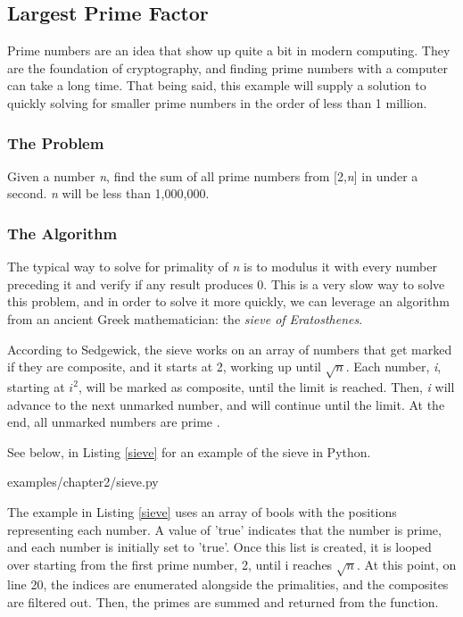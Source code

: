 \documentclass[12pt, oneside, a4paper]{book}
\begin{document}
         \subsection{Largest Prime Factor}
         Prime numbers are an idea that show up quite a bit in modern computing.
         They are the foundation of cryptography, and finding prime numbers with a computer can take a long time.
         That being said, this example will supply a solution to quickly solving for smaller prime numbers in the order of less than 1 million.

         \subsubsection{The Problem}
         Given a number \textit{n}, find the sum of all prime numbers from [2,\textit{n}] in under a second.
         \textit{n} will be less than 1,000,000.

         \subsubsection{The Algorithm}
         The typical way to solve for primality of \textit{n} is to modulus it with every number preceding it and verify if any result produces 0.
         This is a very slow way to solve this problem, and in order to solve it more quickly, we can leverage an algorithm from an ancient Greek mathematician: the \textit{sieve of Eratosthenes}.

         According to Sedgewick, the sieve works on an array of numbers that get marked if they are composite, and it starts at 2, working up until $\sqrt{n}$.
         Each number, \textit{i}, starting at \textit{$i^2$}, will be marked as composite, until the limit is reached.
         Then, \textit{i} will advance to the next unmarked number, and will continue until the limit.
         At the end, all unmarked numbers are prime \autocite{sedgewickAlgorithms1992}.

         See below, in Listing \ref{sieve} for an example of the sieve in Python.
         
         {examples/chapter2/sieve.py}

         The example in Listing \ref{sieve} uses an array of bools with the positions representing each number.
         A value of 'true' indicates that the number is prime, and each number is initially set to 'true'.
         Once this list is created, it is looped over starting from the first prime number, 2, until i reaches $\sqrt{n}$.
         At this point, on line 20, the indices are enumerated alongside the primalities, and the composites are filtered out.
         Then, the primes are summed and returned from the function.
\end{document}

